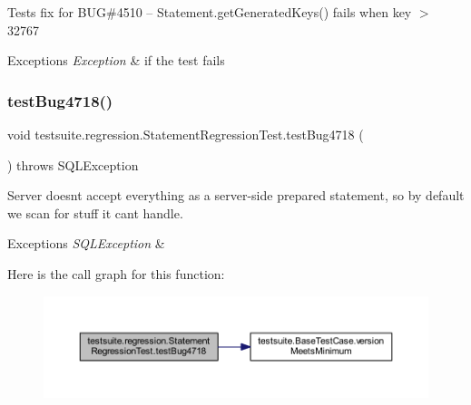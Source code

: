 Tests fix for B\+UG\#4510 -- Statement.\+get\+Generated\+Keys() fails when key $>$ 32767


\begin{DoxyExceptions}{Exceptions}
{\em Exception} & if the test fails \\
\hline
\end{DoxyExceptions}
\mbox{\label{classtestsuite_1_1regression_1_1_statement_regression_test_a4a5feeaaf1b8fb177b2f026231e14165}} 
\subsubsection{\texorpdfstring{test\+Bug4718()}{testBug4718()}}
{\footnotesize\ttfamily void testsuite.\+regression.\+Statement\+Regression\+Test.\+test\+Bug4718 (\begin{DoxyParamCaption}{ }\end{DoxyParamCaption}) throws S\+Q\+L\+Exception}

Server doesn\textquotesingle{}t accept everything as a server-\/side prepared statement, so by default we scan for stuff it can\textquotesingle{}t handle.


\begin{DoxyExceptions}{Exceptions}
{\em S\+Q\+L\+Exception} & \\
\hline
\end{DoxyExceptions}
Here is the call graph for this function\+:
\nopagebreak
\begin{figure}[H]
\begin{center}
\leavevmode
\includegraphics[width=350pt]{classtestsuite_1_1regression_1_1_statement_regression_test_a4a5feeaaf1b8fb177b2f026231e14165_cgraph}
\end{center}
\end{figure}
\mbox{\label{classtestsuite_1_1regression_1_1_statement_regression_test_a9fbede1821be869adb354fa18fdc4686}} 
